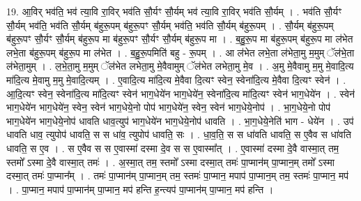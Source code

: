 \documentclass[17pt]{extarticle}
\begin{document}
19. आ॒विर् भव॑ति॒ भव॑ त्या॒वि रा॒विर् भव॑ति सौ॒र्यꣳ सौ॒र्यम् भव॑ त्या॒वि रा॒विर् भव॑ति सौ॒र्यम् । . भव॑ति सौ॒र्यꣳ सौ॒र्यम् भव॑ति॒ भव॑ति सौ॒र्यम् ब॑हुरू॒पम् ब॑हुरू॒पꣳ सौ॒र्यम् भव॑ति॒ भव॑ति सौ॒र्यम् ब॑हुरू॒पम् । . सौ॒र्यम् ब॑हुरू॒पम् ब॑हुरू॒पꣳ सौ॒र्यꣳ सौ॒र्यम् ब॑हुरू॒प मा ब॑हुरू॒पꣳ सौ॒र्यꣳ सौ॒र्यम् ब॑हुरू॒प मा । . ब॒हु॒रू॒प मा ब॑हुरू॒पम् ब॑हुरू॒प मा ल॑भेत लभे॒ता ब॑हुरू॒पम् ब॑हुरू॒प मा ल॑भेत । . ब॒हु॒रू॒पमिति॑ बहु - रू॒पम् । . आ ल॑भेत लभे॒ता ल॑भेता॒मु म॒मुम् ॅल॑भे॒ता ल॑भेता॒मुम् । . ल॒भे॒ता॒मु म॒मुम् ॅल॑भेत लभेता॒मु मे॒वैवामुम् ॅल॑भेत लभेता॒मु मे॒व । . अ॒मु मे॒वैवामु म॒मु मे॒वादि॒त्य मा॑दि॒त्य मे॒वामु म॒मु मे॒वादि॒त्यम् । . ए॒वादि॒त्य मा॑दि॒त्य मे॒वैवा दि॒त्यꣳ स्वेन॒ स्वेना॑दि॒त्य मे॒वैवा दि॒त्यꣳ स्वेन॑ । . आ॒दि॒त्यꣳ स्वेन॒ स्वेना॑दि॒त्य मा॑दि॒त्यꣳ स्वेन॑ भाग॒धेये॑न भाग॒धेये॑न॒ स्वेना॑दि॒त्य मा॑दि॒त्यꣳ स्वेन॑ भाग॒धेये॑न । . स्वेन॑ भाग॒धेये॑न भाग॒धेये॑न॒ स्वेन॒ स्वेन॑ भाग॒धेये॒नो पोप॑ भाग॒धेये॑न॒ स्वेन॒ स्वेन॑ भाग॒धेये॒नोप॑ । . भा॒ग॒धेये॒नो पोप॑ भाग॒धेये॑न भाग॒धेये॒नोप॑ धावति धाव॒त्युप॑ भाग॒धेये॑न भाग॒धेये॒नोप॑ धावति । . भा॒ग॒धेये॒नेति॑ भाग - धेये॑न । . उप॑ धावति धाव॒ त्युपोप॑ धावति॒ स स धा॑व॒ त्युपोप॑ धावति॒ सः । . धा॒व॒ति॒ स स धा॑वति धावति॒ स ए॒वैव स धा॑वति धावति॒ स ए॒व । . स ए॒वैव स स ए॒वास्मा॑ दस्मा दे॒व स स ए॒वास्मा᳚त् । . ए॒वास्मा॑ दस्मा दे॒वै वास्मा॒त् तम॒ स्तमो᳚ ऽस्मा दे॒वै वास्मा॒त् तमः॑ । . अ॒स्मा॒त् तम॒ स्तमो᳚ ऽस्मा दस्मा॒त् तमः॑ पा॒प्मान॑म् पा॒प्मान॒म् तमो᳚ ऽस्मा दस्मा॒त् तमः॑ पा॒प्मान᳚म् । . तमः॑ पा॒प्मान॑म् पा॒प्मान॒म् तम॒ स्तमः॑ पा॒प्मान॒ मपाप॑ पा॒प्मान॒म् तम॒ स्तमः॑ पा॒प्मान॒ मप॑ । . पा॒प्मान॒ मपाप॑ पा॒प्मान॑म् पा॒प्मान॒ मप॑ हन्ति ह॒न्त्यप॑ पा॒प्मान॑म् पा॒प्मान॒ मप॑ हन्ति । \newline
\end{document}

